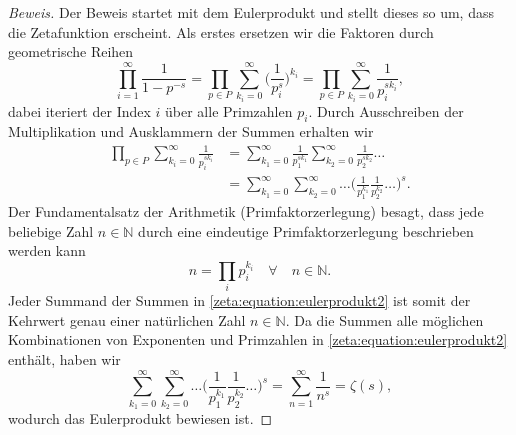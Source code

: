 \begin{proof}[Beweis]
    Der Beweis startet mit dem Eulerprodukt und stellt dieses so um, dass die Zetafunktion erscheint.
    Als erstes ersetzen wir die Faktoren durch geometrische Reihen
    \begin{equation}
        \prod_{i=1}^{\infty}
        \frac{1}{1-p^{-s}}
        =
        \prod_{p \in P}
        \sum_{k_i=0}^{\infty}
        \biggl(
        \frac{1}{p_i^s}
        \biggr)^{k_i}
        =
        \prod_{p \in P}
        \sum_{k_i=0}^{\infty}
        \frac{1}{p_i^{s k_i}},
    \end{equation}
    dabei iteriert der Index $i$ über alle Primzahlen $p_i$.
    Durch Ausschreiben der Multiplikation und Ausklammern der Summen erhalten wir
    \begin{align}
        \prod_{p \in P}
        \sum_{k_i=0}^{\infty}
        \frac{1}{p_i^{s k_i}}
        &=
        \sum_{k_1=0}^{\infty}
        \frac{1}{p_1^{s k_1}}
        \sum_{k_2=0}^{\infty}
        \frac{1}{p_2^{s k_2}}
        \ldots
        \nonumber \\
        &=
        \sum_{k_1=0}^{\infty}
        \sum_{k_2=0}^{\infty}
        \ldots
        \biggl(
        \frac{1}{p_1^{k_1}}
        \frac{1}{p_2^{k_2}}
        \ldots
        \biggr)^s.
        \label{zeta:equation:eulerprodukt2}
    \end{align}
    Der Fundamentalsatz der Arithmetik (Primfaktorzerlegung) besagt, dass jede beliebige Zahl $n \in \mathbb{N}$ durch eine eindeutige Primfaktorzerlegung beschrieben werden kann
    \begin{equation}
        n = \prod_i p_i^{k_i} \quad \forall \quad n \in \mathbb{N}.
    \end{equation}
    Jeder Summand der Summen in \eqref{zeta:equation:eulerprodukt2} ist somit der Kehrwert genau einer natürlichen Zahl $n \in \mathbb{N}$.
    Da die Summen alle möglichen Kombinationen von Exponenten und Primzahlen in \eqref{zeta:equation:eulerprodukt2} enthält, haben wir
    \begin{equation}
        \sum_{k_1=0}^{\infty}
        \sum_{k_2=0}^{\infty}
        \ldots
        \biggl(
        \frac{1}{p_1^{k_1}}
        \frac{1}{p_2^{k_2}}
        \ldots
        \biggr)^s
        =
        \sum_{n=1}^\infty
        \frac{1}{n^s}
        =
        \zeta(s),
    \end{equation}
    wodurch das Eulerprodukt bewiesen ist.
\end{proof}

